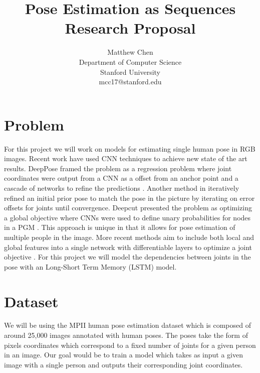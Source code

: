 \documentclass[12pt]{article}
\begin{document}
\title{Pose Estimation as Sequences \\ \small Research Proposal}
\author{Matthew Chen\\
  \small \vspace{-2mm} Department of Computer Science\\
  \small \vspace{-2mm} Stanford University\\
  \small mcc17@stanford.edu}
\date{}
\maketitle

\section{Problem}

For this project we will work on models for estimating single human pose in RGB images. Recent work have used CNN techniques to achieve new state of the art results. DeepPose framed the problem as a regression problem where joint coordinates were output from a CNN as a offset from an anchor point and a cascade of networks to refine the predictions \cite{toshev2014deeppose}. Another method in \cite{carreira2015human} iteratively refined an initial prior pose to match the pose in the picture by iterating on error offsets for joints until convergence. Deepcut presented the problem as optimizing a global objective where CNNs were used to define unary probabilities for nodes in a PGM \cite{pishchulin2015deepcut}. This approach is unique in that it allows for pose estimation of multiple people in the image. More recent methods aim to include both local and global features into a single network with differentiable layers to optimize a joint objective \cite{wei2016convolutional} \cite{newell2016stacked}. For this project we will model the dependencies between joints in the pose with an Long-Short Term Memory (LSTM) model.

\section{Dataset}

We will be using the MPII human pose estimation dataset which is composed of around 25,000 images annotated with human poses. The poses take the form of pixels coordinates which correspond to a fixed number of joints for a given person in an image. Our goal would be to train a model which takes as input a given image with a single person and outputs their corresponding joint coordinates.
\end{document}
